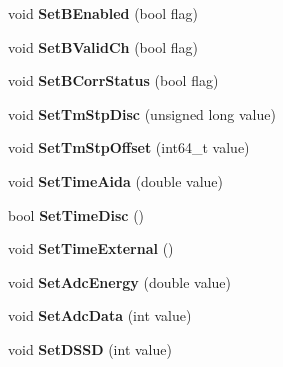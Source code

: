 \begin{DoxyCompactItemize}
\item 
\hypertarget{classCalibrator_a5eb83a1e8d7aa99d37d363a29ace1543}{void {\bfseries Set\-B\-Enabled} (bool flag)}\label{classCalibrator_a5eb83a1e8d7aa99d37d363a29ace1543}

\item 
\hypertarget{classCalibrator_a3a3ba7fceff79480b6c59c1f826cd8a6}{void {\bfseries Set\-B\-Valid\-Ch} (bool flag)}\label{classCalibrator_a3a3ba7fceff79480b6c59c1f826cd8a6}

\item 
\hypertarget{classCalibrator_a078be8ee6fbdd2eea6c073dba8d69c4f}{void {\bfseries Set\-B\-Corr\-Status} (bool flag)}\label{classCalibrator_a078be8ee6fbdd2eea6c073dba8d69c4f}

\item 
\hypertarget{classCalibrator_a2f4e6b87e0786efe1efa84cc6853e6df}{void {\bfseries Set\-Tm\-Stp\-Disc} (unsigned long value)}\label{classCalibrator_a2f4e6b87e0786efe1efa84cc6853e6df}

\item 
\hypertarget{classCalibrator_a1b71aa7adcf96d385a22f72a35ac994f}{void {\bfseries Set\-Tm\-Stp\-Offset} (int64\-\_\-t value)}\label{classCalibrator_a1b71aa7adcf96d385a22f72a35ac994f}

\item 
\hypertarget{classCalibrator_a4b7974cfc235a0500967142ea227dd6f}{void {\bfseries Set\-Time\-Aida} (double value)}\label{classCalibrator_a4b7974cfc235a0500967142ea227dd6f}

\item 
\hypertarget{classCalibrator_ad055eb2d7896008f09dc9022f2d182c3}{bool {\bfseries Set\-Time\-Disc} ()}\label{classCalibrator_ad055eb2d7896008f09dc9022f2d182c3}

\item 
\hypertarget{classCalibrator_a1b8802f1cd749a0dd775f78910659dc2}{void {\bfseries Set\-Time\-External} ()}\label{classCalibrator_a1b8802f1cd749a0dd775f78910659dc2}

\item 
\hypertarget{classCalibrator_a1d04f59f1dae60c56f4b7f6fc6ab095a}{void {\bfseries Set\-Adc\-Energy} (double value)}\label{classCalibrator_a1d04f59f1dae60c56f4b7f6fc6ab095a}

\item 
\hypertarget{classCalibrator_afe59a684b94aa27ed099ad55d2853092}{void {\bfseries Set\-Adc\-Data} (int value)}\label{classCalibrator_afe59a684b94aa27ed099ad55d2853092}

\item 
\hypertarget{classCalibrator_a75f23d39f9057568b8912271e40c5573}{void {\bfseries Set\-D\-S\-S\-D} (int value)}\label{classCalibrator_a75f23d39f9057568b8912271e40c5573}


\end{DoxyCompactItemize}
